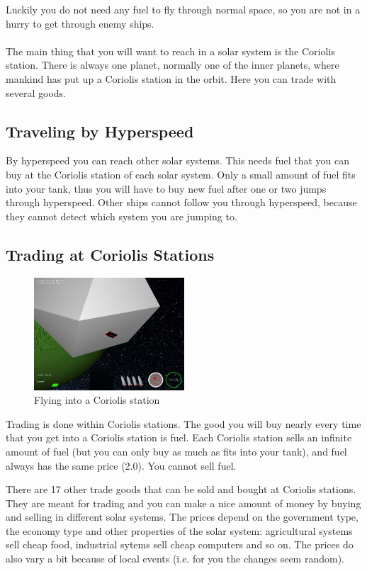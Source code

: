 \documentclass[a4paper,11pt]{article}
\begin{document}
Luckily you do not need any fuel to fly through normal space, so you are not in a hurry to get through enemy ships.\\
\ \\
The main thing that you will want to reach in a solar system is the Coriolis station. There is always one planet, normally one of the inner planets, where mankind has put up a Coriolis station in the orbit. Here you can trade with several goods.

\subsection{Traveling by Hyperspeed} 
By hyperspeed you can reach other solar systems. This needs fuel that you can buy at the Coriolis station of each solar system. Only a small amount of fuel fits into your tank, thus you will have to buy new fuel after one or two jumps through hyperspeed.
Other ships cannot follow you through hyperspeed, because they cannot detect which system you are jumping to. 

\subsection{Trading at Coriolis Stations}
\begin{figure}[ht]
	\centering
		\includegraphics[width=0.50\textwidth]{flyingincoriolis.jpg}
		\caption{Flying into a Coriolis station\label{flyingintocoriolis}}
\end{figure}
\label{rulesForTrading}
Trading is done within Coriolis stations. The good you will buy nearly every time that you get into a Coriolis station is fuel. Each Coriolis station sells an infinite amount of fuel (but you can only buy as much as fits into your tank), and fuel always has the same price (2.0). You cannot sell fuel.

There are 17 other trade goods that can be sold and bought at Coriolis stations. They are meant for trading and you can make a nice amount of money by buying and selling in different solar systems. The prices depend on the government type, the economy type and other properties of the solar system: agricultural systems sell cheap food, industrial sytems sell cheap computers and so on. The prices do also vary a bit because of local events (i.e. for you the changes seem random).
\end{document}
